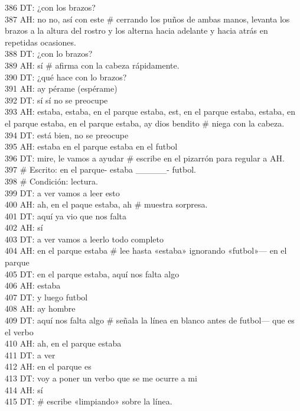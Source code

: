 386 DT: ¿con los brazos?\\
387 AH: no no, así con este \# cerrando los puños de ambas manos, levanta los brazos a la altura del rostro y los alterna hacia adelante y hacia atrás en repetidas ocasiones.\\
388 DT: ¿con lo brazos?\\
389 AH: sí \# afirma con la cabeza rápidamente.\\
390 DT: ¿qué hace con lo brazos?\\
391 AH: ay pérame (espérame)\\
392 DT: sí sí no se preocupe\\
393 AH: estaba, estaba, en el parque estaba, est, en el parque estaba, estaba, en el parque estaba, en el parque estaba, ay dios bendito \# niega con la cabeza.\\
394 DT: está bien, no se preocupe\\
395 AH: estaba en el parque estaba en el futbol\\
396 DT: mire, le vamos a ayudar \# escribe en el pizarrón para regular a AH.\\
397 \# Escrito: en el parque- estaba \_\_\_\_\_- futbol.\\
398 \# Condición: lectura.\\
399 DT: a ver vamos a leer esto\\
400 AH: ah, en el paque estaba, ah \# muestra sorpresa.\\
401 DT: aquí ya vio que nos falta\\
402 AH: sí\\
403 DT: a ver vamos a leerlo todo completo\\
404 AH: en el parque estaba \# lee hasta «estaba» ignorando «futbol»--- en el parque\\
405 DT: en el parque estaba, aquí nos falta algo\\
406 AH: estaba\\
407 DT: y luego futbol\\
408 AH: ay hombre\\
409 DT: aquí nos falta algo \# señala la línea en blanco antes de futbol--- que es el verbo\\
410 AH: ah, en el parque estaba\\
411 DT: a ver\\
412 AH: en el parque es\\
413 DT: voy a poner un verbo que se me ocurre a mi\\
414 AH: sí\\
415 DT: \# escribe «limpiando» sobre la línea.\\
